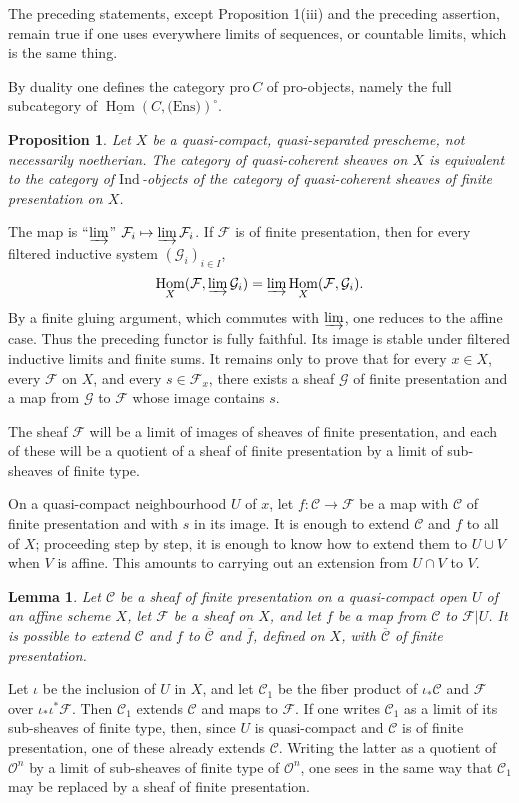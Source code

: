 \documentclass[12pt]{amsart}
\theoremstyle{plain}
\newtheorem{prop}{Proposition}
\newtheorem{lem}{Lemma}
\theoremstyle{definition}
\DeclareMathOperator{\Hom}{Hom}
\newcommand{\Ind}{\text{Ind}\,}
\newcommand{\Pro}{\text{pro}\,}
\newcommand{\cF}{\mathcal{F}}
\newcommand{\cG}{\mathcal{G}}
\newcommand{\cO}{\mathcal{O}}
\newcommand{\cC}{\mathcal{C}}
\begin{document}
The preceding statements, except Proposition 1(iii) and the preceding assertion, remain true if one uses everywhere limits of sequences, or countable limits, which is the same thing.

By duality one defines the category $\Pro C$ of pro-objects, namely the full subcategory of $\underline{\Hom}(C,\text{(Ens)})^{\circ}$.

\begin{prop}
Let $X$ be a quasi-compact, quasi-separated prescheme, not necessarily noetherian. The category of quasi-coherent sheaves on $X$ is equivalent to the category of $\Ind$-objects of the category of quasi-coherent sheaves of finite presentation on $X$.
\end{prop}

The map is ``$\varinjlim$'' $\cF_i\mapsto\varinjlim\cF_i$. If $\cF$ is of finite presentation, then for every filtered inductive system $(\cG_i)_{i\in I}$,
\[
\Hom_X(\cF,\varinjlim\cG_i)=\varinjlim\Hom_X(\cF,\cG_i).
\]
By a finite gluing argument, which commutes with $\varinjlim$, one reduces to the affine case. Thus the preceding functor is fully faithful. Its image is stable under filtered inductive limits and finite sums. It remains only to prove that for every $x\in X$, every $\cF$ on $X$, and every $s\in\cF_x$, there exists a sheaf $\cG$ of finite presentation and a map from $\cG$ to $\cF$ whose image contains $s$.

The sheaf $\cF$ will be a limit of images of sheaves of finite presentation, and each of these will be a quotient of a sheaf of finite presentation by a limit of sub-sheaves of finite type.

On a quasi-compact neighbourhood $U$ of $x$, let $f:\cC\to\cF$ be a map with $\cC$ of finite presentation and with $s$ in its image. It is enough to extend $\cC$ and $f$ to all of $X$; proceeding step by step, it is enough to know how to extend them to $U\cup V$ when $V$ is affine. This amounts to carrying out an extension from $U\cap V$ to $V$.

\begin{lem}
Let $\cC$ be a sheaf of finite presentation on a quasi-compact open $U$ of an affine scheme $X$, let $\cF$ be a sheaf on $X$, and let $f$ be a map from $\cC$ to $\cF|U$. It is possible to extend $\cC$ and $f$ to $\overline{\cC}$ and $\overline f$, defined on $X$, with $\overline{\cC}$ of finite presentation.
\end{lem}

Let $\iota$ be the inclusion of $U$ in $X$, and let $\cC_1$ be the fiber product of $\iota_*\cC$ and $\cF$ over $\iota_*\iota^*\cF$. Then $\cC_1$ extends $\cC$ and maps to $\cF$. If one writes $\cC_1$ as a limit of its sub-sheaves of finite type, then, since $U$ is quasi-compact and $\cC$ is of finite presentation, one of these already extends $\cC$. Writing the latter as a quotient of $\cO^n$ by a limit of sub-sheaves of finite type of $\cO^n$, one sees in the same way that $\cC_1$ may be replaced by a sheaf of finite presentation.
\end{document}

